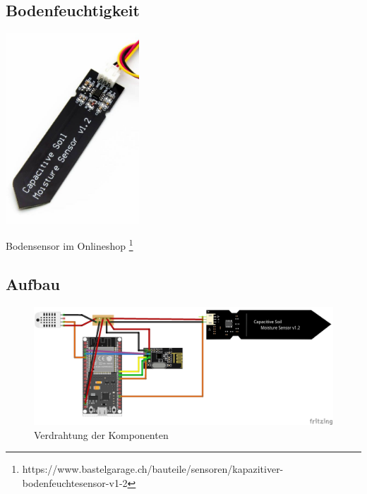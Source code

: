 \documentclass[
  12pt, %
  a4paper, %
  twoside, %
  openright, %
  numbers=noenddot, %
  BCOR=5mm, %
  parskip=half*, %
  thesis, %
]{bfhbook}
\begin{document}
\subsection{Bodenfeuchtigkeit}

\begin{center}
\includegraphics[width=5cm, left]{Bilder/Soil-2.jpg}%
\label{labelname}%
\end{center}
Bodensensor im Onlineshop \footnote{https://www.bastelgarage.ch/bauteile/sensoren/kapazitiver-bodenfeuchtesensor-v1-2}

\subsection{Aufbau}
\begin{figure}[htp]
  \begin{center}
    \includegraphics[width=17cm, left]{Bilder/Sensor-Design_Steckplatine.png}
  \end{center}
    \caption{Verdrahtung der Komponenten}
\end{figure}
\end{document}
